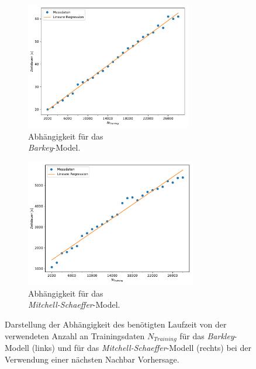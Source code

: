 \begin{figure}[h]
	\centering
	\begin{subfigure}{.5\textwidth}
		\centering
		\includegraphics[height=2.2in]{figures/results/cross_prediction/nn_trainlength_uv_time.pdf}
		\setcapmargin[1cm]{1cm}
		\caption{Abhängigkeit für das \\ \textit{Barkey}-Model.}
		\label{fig:exp_cross_nn_trainlength_time_uv}
	\end{subfigure}%
	\begin{subfigure}{.5\textwidth}
		\centering
		\includegraphics[height=2.2in]{figures/results/cross_prediction/nn_trainlength_vh_time.pdf}
		\setcapmargin[1cm]{1cm}
		\caption{Abhängigkeit für das \\ \textit{Mitchell-Schaeffer}-Model.}
		\label{fig:exp_cross_nn_trainlength_time_vh}
	\end{subfigure}
	\caption{Darstellung der Abhängigkeit des benötigten Laufzeit von der verwendeten Anzahl an Trainingsdaten $N_{Training}$ für das \textit{Barkley}-Modell (links) und für das \textit{Mitchell-Schaeffer}-Modell (rechts) bei der Verwendung einer nächsten Nachbar Vorhersage.}
	\label{fig:exp_cross_nn_trainlength_time}
\end{figure}

